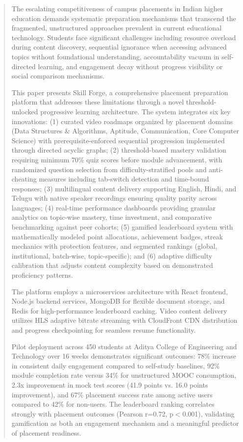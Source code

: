 \documentclass[journal]{IEEEtran}
\begin{document}
\begin{abstract}
The escalating competitiveness of campus placements in Indian higher education demands systematic preparation mechanisms that transcend the fragmented, unstructured approaches prevalent in current educational technology. Students face significant challenges including resource overload during content discovery, sequential ignorance when accessing advanced topics without foundational understanding, accountability vacuum in self-directed learning, and engagement decay without progress visibility or social comparison mechanisms.

This paper presents Skill Forge, a comprehensive placement preparation platform that addresses these limitations through a novel threshold-unlocked progressive learning architecture. The system integrates six key innovations: (1) curated video roadmaps organized by placement domains (Data Structures \& Algorithms, Aptitude, Communication, Core Computer Science) with prerequisite-enforced sequential progression implemented through directed acyclic graphs; (2) threshold-based mastery validation requiring minimum 70\% quiz scores before module advancement, with randomized question selection from difficulty-stratified pools and anti-cheating measures including tab-switch detection and time-bound responses; (3) multilingual content delivery supporting English, Hindi, and Telugu with native speaker recordings ensuring quality parity across languages; (4) real-time performance dashboards providing granular analytics on topic-wise mastery, time investment, and comparative benchmarking against peer cohorts; (5) gamified leaderboard system with mathematically modeled point allocations, achievement badges, streak mechanics with protection features, and segmented rankings (global, institutional, batch-wise, topic-specific); and (6) adaptive difficulty calibration that adjusts content complexity based on demonstrated proficiency patterns.

The platform employs a microservices architecture with React frontend, Node.js backend services, MongoDB for flexible document storage, and Redis for high-performance leaderboard caching. Video content delivery utilizes HLS adaptive bitrate streaming with CloudFront CDN distribution and progress checkpointing for seamless resume functionality.

Pilot deployment across 450 students at Aditya College of Engineering and Technology over 16 weeks demonstrates significant outcomes: 78\% increase in consistent daily engagement compared to self-study baselines, 92\% module completion rate versus 34\% for unstructured MOOC consumption, 2.3x improvement in mock test scores (41.9 points vs. 16.0 points improvement), and 67\% placement success rate among active users compared to 42\% for non-users. The leaderboard ranking correlates strongly with placement outcomes (Pearson r=0.72, p$<$0.001), validating gamification as both an engagement mechanism and a meaningful predictor of placement readiness.


\end{abstract}
\end{document}
